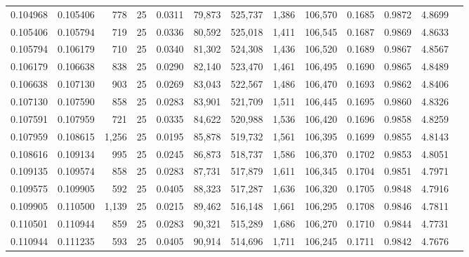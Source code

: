 \begin{tabular}{rrrrrrrrrrrrr}
0.104968 & 0.105406 &   778 &  25 &                                     0.0311 &  79,873 & 525,737 &   1,386 & 106,570 & 0.1685 & 0.9872 & 4.8699 \\
0.105406 & 0.105794 &   719 &  25 &                                     0.0336 &  80,592 & 525,018 &   1,411 & 106,545 & 0.1687 & 0.9869 & 4.8633 \\
0.105794 & 0.106179 &   710 &  25 &                                     0.0340 &  81,302 & 524,308 &   1,436 & 106,520 & 0.1689 & 0.9867 & 4.8567 \\
0.106179 & 0.106638 &   838 &  25 &                                     0.0290 &  82,140 & 523,470 &   1,461 & 106,495 & 0.1690 & 0.9865 & 4.8489 \\
0.106638 & 0.107130 &   903 &  25 &                                     0.0269 &  83,043 & 522,567 &   1,486 & 106,470 & 0.1693 & 0.9862 & 4.8406 \\
0.107130 & 0.107590 &   858 &  25 &                                     0.0283 &  83,901 & 521,709 &   1,511 & 106,445 & 0.1695 & 0.9860 & 4.8326 \\
0.107591 & 0.107959 &   721 &  25 &                                     0.0335 &  84,622 & 520,988 &   1,536 & 106,420 & 0.1696 & 0.9858 & 4.8259 \\
0.107959 & 0.108615 & 1,256 &  25 &                                     0.0195 &  85,878 & 519,732 &   1,561 & 106,395 & 0.1699 & 0.9855 & 4.8143 \\
0.108616 & 0.109134 &   995 &  25 &                                     0.0245 &  86,873 & 518,737 &   1,586 & 106,370 & 0.1702 & 0.9853 & 4.8051 \\
0.109135 & 0.109574 &   858 &  25 &                                     0.0283 &  87,731 & 517,879 &   1,611 & 106,345 & 0.1704 & 0.9851 & 4.7971 \\
0.109575 & 0.109905 &   592 &  25 &                                     0.0405 &  88,323 & 517,287 &   1,636 & 106,320 & 0.1705 & 0.9848 & 4.7916 \\
0.109905 & 0.110500 & 1,139 &  25 &                                     0.0215 &  89,462 & 516,148 &   1,661 & 106,295 & 0.1708 & 0.9846 & 4.7811 \\
0.110501 & 0.110944 &   859 &  25 &                                     0.0283 &  90,321 & 515,289 &   1,686 & 106,270 & 0.1710 & 0.9844 & 4.7731 \\
0.110944 & 0.111235 &   593 &  25 &                                     0.0405 &  90,914 & 514,696 &   1,711 & 106,245 & 0.1711 & 0.9842 & 4.7676 \\

\end{tabular}
